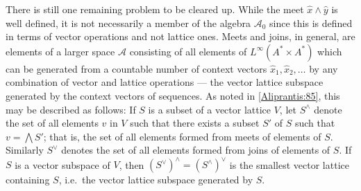 \documentclass[11pt]{report}
\begin{document}
There is still one remaining problem to be cleared up. While the meet $\hat{x} \land \hat{y}$ is well defined, it is not necessarily a member of the algebra $\mathcal{A}_0$ since this is defined in terms of vector operations and not lattice ones. Meets and joins, in general, are elements of a larger space $\mathcal{A}$ consisting of all elements of $L^\infty(A^*\times A^*)$ which can be generated from a countable number of context vectors $\hat{x}_1, \hat{x}_2, \ldots$ by any combination of vector and lattice operations --- the vector lattice subspace generated by the context vectors of sequences. As noted in \ref{Aliprantis:85}, this may be described as follows: If $S$ is a subset of a vector lattice $V$, let $S^\land$ denote the set of all elements $v$ in $V$ such that there exists a subset $S'$ of $S$ such that $v = \bigwedge S'$; that is, the set of all elements formed from meets of elements of $S$. Similarly $S^\lor$ denotes the set of all elements formed from joins of elements of $S$. If $S$ is a vector subspace of $V$, then $(S^\lor)^\land = (S^\land)^\lor$ is the smallest vector lattice containing $S$, i.e.~the vector lattice subspace generated by $S$. 


\end{document}
